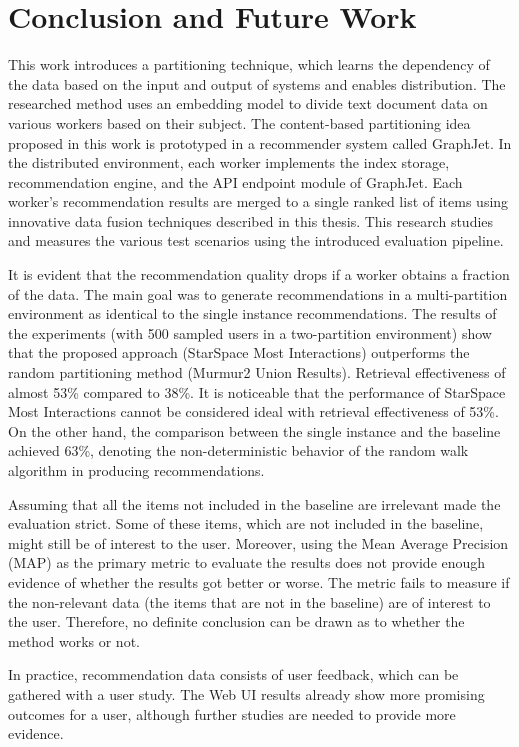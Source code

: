 \chapter{Conclusion and Future Work}
\label{chap:conclusion}
This work introduces a partitioning technique, which learns the dependency of the data based on the input and output of systems and enables distribution. The researched method uses an embedding model to divide text document data on various workers based on their subject. The content-based partitioning idea proposed in this work is prototyped in a recommender system called GraphJet. In the distributed environment, each worker implements the index storage, recommendation engine, and the API endpoint module of GraphJet. Each worker's recommendation results are merged to a single ranked list of items using innovative data fusion techniques described in this thesis. This research studies and measures the various test scenarios using the introduced evaluation pipeline.


It is evident that the recommendation quality drops if a worker obtains a fraction of the data. The main goal was to generate recommendations in a multi-partition environment as identical to the single instance recommendations. The results of the experiments (with 500 sampled users in a two-partition environment) show that the proposed approach (StarSpace Most Interactions) outperforms the random partitioning method (Murmur2 Union Results). Retrieval effectiveness of almost 53\% compared to 38\%. It is noticeable that the performance of StarSpace Most Interactions cannot be considered ideal with retrieval effectiveness of 53\%. On the other hand, the comparison between the single instance and the baseline achieved 63\%, denoting the non-deterministic behavior of the random walk algorithm in producing recommendations.


Assuming that all the items not included in the baseline are irrelevant made the evaluation strict. Some of these items, which are not included in the baseline, might still be of interest to the user. Moreover, using the Mean Average Precision (MAP) as the primary metric to evaluate the results does not provide enough evidence of whether the results got better or worse. The metric fails to measure if the non-relevant data (the items that are not in the baseline) are of interest to the user. Therefore, no definite conclusion can be drawn as to whether the method works or not. 


In practice, recommendation data consists of user feedback, which can be gathered with a user study. The Web UI results already show more promising outcomes for a user, although further studies are needed to provide more evidence. 



